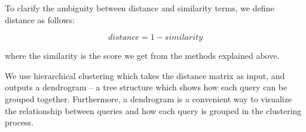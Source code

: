 To clarify the ambiguity between distance and similarity terms, we define distance as follows:

$$distance = 1 - similarity$$

where the similarity is the score we get from the methods explained above. 








We use hierarchical clustering
which takes the distance matrix as input, and outputs a dendrogram -- a tree structure which shows how each query can be grouped together.
Furthermore, a dendrogram is a convenient way to visualize the relationship between queries and how each query is grouped in the clustering process.

